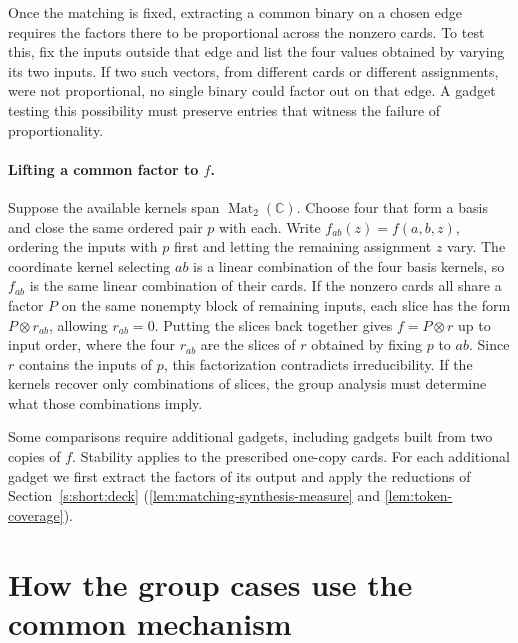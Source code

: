 \documentclass[11pt,letterpaper,onecolumn]{article}
\theoremstyle{plain}
\theoremstyle{definition}
\theoremstyle{remark}
\newcommand{\Mat}{\operatorname{Mat}}
\begin{document}
Once the matching is fixed, extracting a common binary on a chosen
edge requires the factors there to be proportional across the nonzero
cards. To test this, fix the inputs outside that edge and list the four
values obtained by varying its two inputs. If two such vectors, from
different cards or different assignments, were not proportional, no
single binary could factor out on that edge. A gadget testing this
possibility must preserve entries that witness the failure of
proportionality.

\paragraph{Lifting a common factor to \(f\).}
Suppose the available kernels span \(\Mat_2(\mathbb C)\). Choose four
that form a basis and close the same ordered pair \(p\) with each.
Write \(f_{ab}(z)=f(a,b,z)\), ordering the inputs with \(p\) first
and letting the remaining assignment \(z\) vary. The coordinate kernel
selecting \(ab\) is a linear combination of the four basis kernels,
so \(f_{ab}\) is the same linear combination of their cards. If the nonzero
cards all share a factor \(P\) on the same nonempty block of remaining
inputs, each slice has the form \(P\otimes r_{ab}\), allowing
\(r_{ab}=0\). Putting the slices back together gives \(f=P\otimes r\)
up to input order, where the four \(r_{ab}\) are the slices of \(r\)
obtained by fixing \(p\) to \(ab\). Since \(r\) contains the inputs of
\(p\), this factorization contradicts irreducibility. If the kernels
recover only combinations of slices, the group analysis must determine
what those combinations imply.

Some comparisons require additional gadgets, including gadgets built
from two copies of \(f\). Stability applies to the prescribed one-copy
cards. For each additional gadget we first extract the factors of its
output and apply the reductions of Section~\ref{s:short:deck}
(\cref{lem:matching-synthesis-measure} and
\cref{lem:token-coverage}).

\section{How the group cases use the common mechanism}
\label{s:short:groups}
\end{document}
